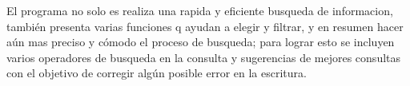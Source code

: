 \documentclass[a4paper,12pt]{article}
\begin{document}
El programa no solo es realiza una rapida y eficiente busqueda de informacion, también presenta varias funciones q ayudan a elegir y filtrar, y en resumen hacer aún mas preciso y cómodo el proceso de busqueda; para lograr esto se incluyen varios operadores de busqueda en la consulta y sugerencias de mejores consultas con el objetivo de corregir algún posible error en la escritura.
\end{document}
